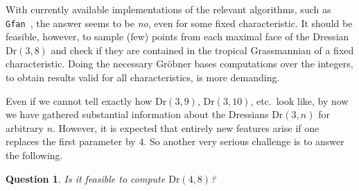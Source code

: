 \documentclass[11pt,a4paper]{amsart}
\newcommand{\Dr}[2]{{\mathrm{Dr}(#1,#2)}}
\theoremstyle{plain}
\newtheorem{question}[theorem]{Question}
\theoremstyle{definition}
\begin{document}
With currently available implementations of the relevant algorithms, such as
\texttt{Gfan}~\cite{gfan}, the answer seems to be \emph{no}, even for some fixed characteristic.  It
should be feasible, however, to sample (few) points from each maximal face of the Dressian
$\Dr{3}{8}$ and check if they are contained in the tropical Grassmannian of a fixed characteristic.
Doing the necessary Gr\"obner bases computations over the integers, to obtain results valid for all
characteristics, is more demanding.

Even if we cannot tell exactly how $\Dr{3}{9}$, $\Dr{3}{10}$, etc.\ look like, by now we have
gathered substantial information about the Dressians $\Dr{3}{n}$ for arbitrary $n$.  However, it is
expected that entirely new features arise if one replaces the first parameter by $4$.  So another
very serious challenge is to answer the following.

\begin{question}
  Is it feasible to compute $\Dr{4}{8}$?
\end{question}



\end{document}

